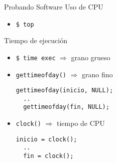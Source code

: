 \begin{frame}[fragile]{Probando Software}
    Uso de CPU
    \begin{itemize}
        \item \verb|$ top|
    \end{itemize}
    Tiempo de ejecución
    \begin{itemize}
        \item \verb|$ time exec| $\Rightarrow$ grano grueso
        \item \verb|gettimeofday()| $\Rightarrow$ grano fino
        \begin{lstlisting}[style=consola]
  gettimeofday(inicio, NULL);
  ..
  gettimeofday(fin, NULL);
        \end{lstlisting}
        \item \verb|clock()| $\Rightarrow$ tiempo de CPU
        \begin{lstlisting}[style=consola]
  inicio = clock();
  ..
  fin = clock();
        \end{lstlisting}
    \end{itemize}
\end{frame}

